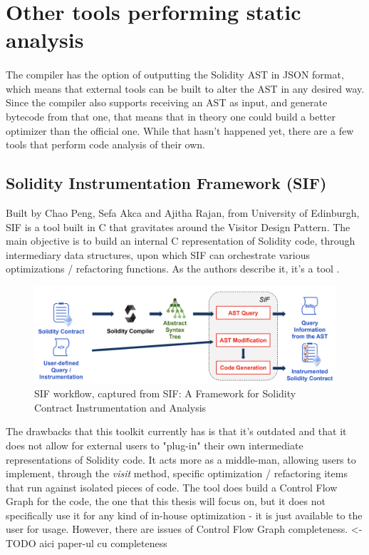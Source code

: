 \section{Other tools performing static analysis}
\paragraph*{}
The compiler has the option of outputting the Solidity AST in JSON format, which means that external tools can be built to alter the AST in any desired way. Since the compiler also supports receiving an AST as input, and generate bytecode from that one, that means that in theory one could build a better optimizer than the official one. While that hasn't happened yet, there are a few tools that perform code analysis of their own.

\subsection{Solidity Instrumentation Framework (SIF)}

Built by Chao Peng, Sefa Akca and Ajitha Rajan, from University of Edinburgh, SIF is a tool built in C that gravitates around the Visitor Design Pattern. The main objective is to build an internal C representation of Solidity code, through intermediary data structures, upon which SIF can orchestrate various optimizations / refactoring functions. As the authors describe it, it's a tool \cite[to easily and effectively understand, manipulate and analyse Solidity code]{sif}.

\begin{figure}
    \centering
    \includegraphics[width=15cm]{images/sif_workflow.png}
    \caption{SIF workflow, captured from SIF: A Framework for Solidity Contract Instrumentation and Analysis\cite{sif}}
    \label{fig:sif-workflow}
\end{figure}

The drawbacks that this toolkit currently has is that it's outdated and that it does not allow for external users to "plug-in" their own intermediate representations of Solidity code. It acts more as a middle-man, allowing users to implement, through the \emph{visit} method, specific optimization / refactoring items that run against isolated pieces of code. The tool does build a Control Flow Graph for the code, the one that this thesis will focus on, but it does not specifically use it for any kind of in-house optimization - it is just available to the user for usage. However, there are issues of Control Flow Graph completeness. <- TODO aici paper-ul cu completeness

